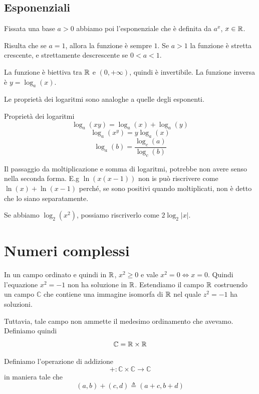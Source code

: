 \documentclass[a4paper]{article}
\begin{document}
\pagebreak

\subsection{Esponenziali}

Fissata una base \(a>0\) abbiamo poi l'esponenziale che è definita da \(a^x\),
\(x\in\mathbb{R}\).

Risulta che se \(a=1\), allora la funzione è sempre \(1\).
Se \(a>1\) la funzione è stretta crescente, e strettamente descrescente se \(0<a<1\).

La funzione è biettiva tra \(\mathbb{R}\) e \((0, +\infty)\), quindi è invertibile.
La funzione inversa è \(y=\log_a(x)\).

Le proprietà dei logaritmi sono analoghe a quelle degli esponenti.
\begin{snippetproposition}{Proprietà dei logaritmi}
    \[
        \log_a(xy) = \log_a(x) + \log_a(y)
    \]
    \[
        \log_a(x^y) = y\log_a(x)
    \]
    \[
        \log_a(b) = \frac{\log_c(a)}{\log_c(b)}
    \]
\end{snippetproposition}



Il passaggio da moltiplicazione e somma di logaritmi, potrebbe non avere senso
nella seconda forma.
E.g \(\ln(x(x-1))\) non is può riscrivere come \(\ln(x) + \ln(x-1)\)
perché, se sono positivi quando moltiplicati, non è detto che lo siano separatamente.

Se abbiamo \(\log_2(x^2)\), possiamo riscriverlo come \(2 \log_2|x|\).

\pagebreak

\section{Numeri complessi}

In un campo ordinato e quindi in \(\mathbb{R}\), \(x^2 \geq 0\) e vale \(x^2 = 0 \iff x=0\).
Quindi l'equazione \(x^2 = -1\) non ha soluzione in \(\mathbb{R}\).
Estendiamo il campo \(\mathbb{R}\) costruendo un campo \(\mathbb{C}\)
che contiene una immagine isomorfa di \(\mathbb{R}\) nel quale \(z^2 = -1\)
ha soluzioni.

Tuttavia, tale campo non ammette il medesimo ordinamento che avevamo.
Definiamo quindi
\[
    \mathbb{C} = \mathbb{R} \times \mathbb{R}
\]

Definiamo l'operazione di addizione
\[
    +\colon \mathbb{C} \times \mathbb{C} \to \mathbb{C}
\]
in maniera tale che
\[
    (a,b) + (c,d) \triangleq (a+c, b+d)
\]
\end{document}
